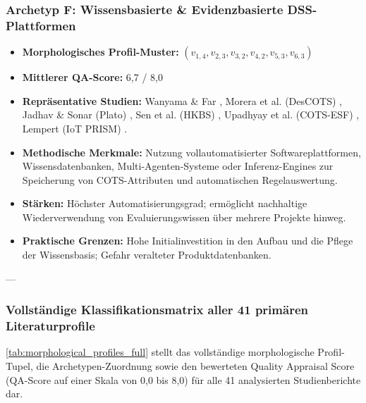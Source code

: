 \subsubsection{Archetyp F: Wissensbasierte \& Evidenzbasierte DSS-Plattformen}
\begin{itemize}
    \item \textbf{Morphologisches Profil-Muster:} $(v_{1,4}, v_{2,3}, v_{3,2}, v_{4,2}, v_{5,3}, v_{6,3})$
    \item \textbf{Mittlerer QA-Score:} 6,7 / 8,0
    \item \textbf{Repräsentative Studien:} Wanyama \& Far \cite{CZZ6XQZJ, WBGP3ETU}, Morera et al. (DesCOTS) \cite{FCYW9EWJ}, Jadhav \& Sonar (Plato) \cite{CI86GRRG, 8VHUMEKY}, Sen et al. (HKBS) \cite{U4E7VXQU}, Upadhyay et al. (COTS-ESF) \cite{WZM7DUBY}, Lempert (IoT PRISM) \cite{RRU375GB}.
    \item \textbf{Methodische Merkmale:} Nutzung vollautomatisierter Softwareplattformen, Wissensdatenbanken, Multi-Agenten-Systeme oder Inferenz-Engines zur Speicherung von COTS-Attributen und automatischen Regelauswertung.
    \item \textbf{Stärken:} Höchster Automatisierungsgrad; ermöglicht nachhaltige Wiederverwendung von Evaluierungswissen über mehrere Projekte hinweg.
    \item \textbf{Praktische Grenzen:} Hohe Initialinvestition in den Aufbau und die Pflege der Wissensbasis; Gefahr veralteter Produktdatenbanken.
\end{itemize}

---

\subsubsection{Vollständige Klassifikationsmatrix aller 41 primären Literaturprofile}

\autoref{tab:morphological_profiles_full} stellt das vollständige morphologische Profil-Tupel, die Archetypen-Zuordnung sowie den bewerteten Quality Appraisal Score (QA-Score auf einer Skala von 0,0 bis 8,0) für alle 41 analysierten Studienberichte dar.

